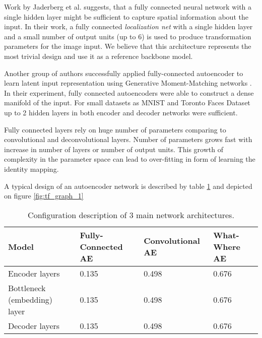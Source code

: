 Work by Jaderberg et al. \cite{Jaderberg2015} suggests, that a fully connected neural network with a single hidden layer might be sufficient to capture spatial information about the input.
In their work, a fully connected \textit{localization net} with a single hidden layer and a small number of output units (up to 6) is used to produce transformation parameters for the image input.
We believe that this architecture represents the most trivial design and use it as a reference backbone model.

Another group of authors successfully applied fully-connected autoencoder to learn latent input representation using Generative Moment-Matching networks \cite{Li2015}.
In their experiment, fully connected autoencoders were able to construct a dense manifold of the input.
For small datasets as MNIST and Toronto Faces Dataset \cite{tfd,lecun-mnisthandwrittendigit-2010} up to 2 hidden layers in both encoder and decoder networks were sufficient.

Fully connected layers rely on huge number of parameters comparing to convolutional and deconvolutional layers.
Number of parameters grows fast with increase in number of layers or number of output units.
This growth of complexity in the parameter space can lead to over-fitting in form of learning the identity mapping.

A typical design of an autoencoder network is described by table \ref{tab:nets} and depicted on figure \ref{fig:tf_graph_1}

\begin{table}
\begin{center}
    \begin{tabular}{| p{28mm} | p{35mm} | p{35mm} | p{35mm} |}
      \hline
       Model & Fully-Connected AE & Convolutional AE & What-Where AE \\ \hline
     Encoder layers		& 0.135 & 0.498 & 0.676 \\ \hline
     Bottleneck \newline (embedding) \newline layer & 0.135 & 0.498 & 0.676 \\ \hline
     Decoder layers		& 0.135 & 0.498 & 0.676 \\ \hline
    \end{tabular}
\end{center}
  \caption{Configuration description of 3 main network architectures.}
  \label{tab:nets}
\end{table}


